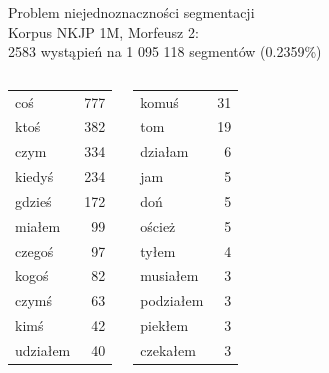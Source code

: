 \documentclass[xcolor=dvipsnames,polish]{beamer}
\begin{document}
\begin{frame}{Problem niejednoznaczności segmentacji}
  \\
  Korpus NKJP 1M, Morfeusz 2:\\
  2583 wystąpień na 1 095 118 segmentów (0.2359\%)
  \begin{columns}[c]
    \begin{center}
      \footnotesize
      \begin{tabular}{l|r}
        coś & 777 \\
        ktoś & 382 \\
        czym & 334 \\
        kiedyś & 234 \\
        gdzieś & 172 \\
        miałem & 99 \\
        czegoś & 97 \\
        kogoś & 82 \\
        czymś & 63 \\
        kimś & 42 \\
        udziałem & 40 \\
      \end{tabular}
    \end{center}
    \begin{center}
      \footnotesize
      \begin{tabular}{l|r}
        komuś & 31 \\
        tom & 19 \\
        działam & 6 \\
        jam & 5 \\
        doń & 5 \\
        oścież & 5 \\
        tyłem & 4 \\
        musiałem & 3 \\
        podziałem & 3 \\
        piekłem & 3 \\
       czekałem & 3 \\
      \end{tabular}
    \end{center}
    \begin{center}
      \footnotesize
      \begin{tabular}{l|r}


\end{tabular}
\end{center}
\end{columns}
\end{frame}
\end{document}
